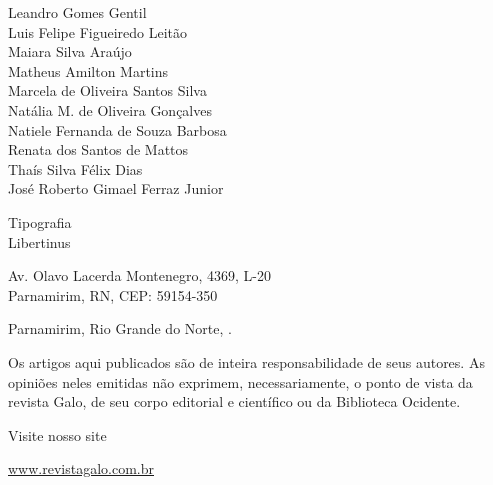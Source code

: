 {\begin{minipage}[t]{.5\textwidth}
\hspace{1.5em}Leandro Gomes Gentil\\
\hspace{1.5em}Luis Felipe Figueiredo Leitão\\
\hspace{1.5em}Maiara Silva Araújo\\
\hspace{1.5em}Matheus Amilton Martins\\
\hspace{1.5em}Marcela de Oliveira Santos Silva\\
\hspace{1.5em}Natália M. de Oliveira Gonçalves\\
\hspace{1.5em}Natiele Fernanda de Souza Barbosa\\
\hspace{1.5em}Renata dos Santos de Mattos\\
\hspace{1.5em}Thaís Silva Félix Dias\\
\hspace{1.5em}José Roberto Gimael Ferraz Junior
\end{minipage}%

\vspace{5mm}

Tipografia\\
\hspace{1.5em}Libertinus

\vfill

Av. Olavo Lacerda Montenegro, 4369, L-20\\
Parnamirim, RN, CEP: 59154-350

\vspace{5mm}

Parnamirim, Rio Grande do Norte, \journalPubFullDate{}.

\clearpage

\thispagestyle{empty}

\begin{vplace}
    \centering Os artigos aqui publicados são de inteira responsabilidade de seus autores. As opiniões neles emitidas não exprimem, necessariamente, o ponto de vista da revista Galo, de seu corpo editorial e científico ou da Biblioteca Ocidente.

    \vspace{5mm}

    Visite nosso site

    \url{www.revistagalo.com.br}
\end{vplace}

}
